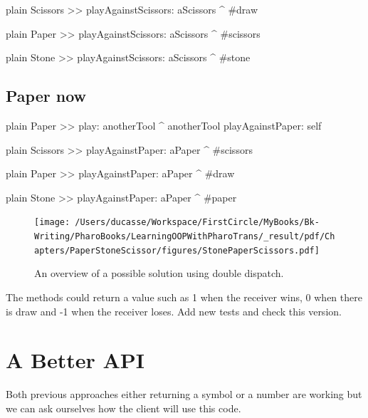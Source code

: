 \documentclass[10pt,twoside,english]{_support/latex/sbabook/sbabook}
\begin{document}
\begin{displaycode}{plain}
Scissors >> playAgainstScissors: aScissors
	^ #draw
\end{displaycode}

\begin{displaycode}{plain}
Paper >> playAgainstScissors: aScissors
	^ #scissors
\end{displaycode}

\begin{displaycode}{plain}
Stone >> playAgainstScissors: aScissors
	^ #stone
\end{displaycode}
\subsection{Paper now}
\begin{displaycode}{plain}
Paper >> play: anotherTool
	^ anotherTool playAgainstPaper: self
\end{displaycode}

\begin{displaycode}{plain}
Scissors >> playAgainstPaper: aPaper
	^ #scissors
\end{displaycode}

\begin{displaycode}{plain}
Paper >> playAgainstPaper: aPaper
	^ #draw
\end{displaycode}

\begin{displaycode}{plain}
Stone >> playAgainstPaper: aPaper
	^ #paper
\end{displaycode}


\begin{figure}

\begin{center}
\texttt{[image: /Users/ducasse/Workspace/FirstCircle/MyBooks/Bk-Writing/PharoBooks/LearningOOPWithPharoTrans/\_result/pdf/Chapters/PaperStoneScissor/figures/StonePaperScissors.pdf]}\caption{An overview of a possible solution using double dispatch.\label{/Users/ducasse/Workspace/FirstCircle/MyBooks/Bk-Writing/PharoBooks/LearningOOPWithPharoTrans/_result/pdf/Chapters/PaperStoneScissor/figures/StonePaperScissors.pdf}}\end{center}
\end{figure}


The methods could return a value such as 1 when the receiver wins, 0 when there is draw and -1 when the receiver loses.  Add new tests and check this version. 
\section{A Better API}
Both previous approaches either returning a symbol or a number are working but we can ask ourselves how the client will use this code. 
\end{document}
